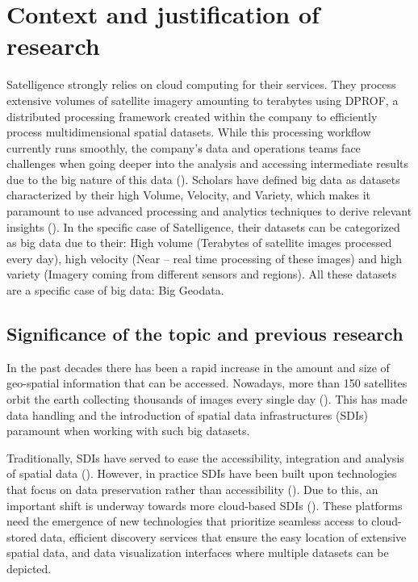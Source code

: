 \documentclass[
  oneside,
  open=any]{scrbook}
\begin{document}
\section{Context and justification of
research}\label{context-and-justification-of-research}

Satelligence strongly relies on cloud computing for their services. They
process extensive volumes of satellite imagery amounting to terabytes
using DPROF, a distributed processing framework created within the
company to efficiently process multidimensional spatial datasets. While
this processing workflow currently runs smoothly, the company's data and
operations teams face challenges when going deeper into the analysis and
accessing intermediate results due to the big nature of this data
().
Scholars have defined big data as datasets characterized by their high
Volume, Velocity, and Variety, which makes it paramount to use advanced
processing and analytics techniques to derive relevant insights
(). In the specific
case of Satelligence, their datasets can be categorized as big data due
to their: High volume (Terabytes of satellite images processed every
day), high velocity (Near -- real time processing of these images) and
high variety (Imagery coming from different sensors and regions). All
these datasets are a specific case of big data: Big Geodata.

\subsection{Significance of the topic and previous
research}\label{significance-of-the-topic-and-previous-research}

In the past decades there has been a rapid increase in the amount and
size of geo-spatial information that can be accessed. Nowadays, more
than 150 satellites orbit the earth collecting thousands of images every
single day (). This
has made data handling and the introduction of spatial data
infrastructures (SDIs) paramount when working with such big datasets.

Traditionally, SDIs have served to ease the accessibility, integration
and analysis of spatial data
(). However, in practice SDIs have been built upon technologies that
focus on data preservation rather than accessibility
(). Due to this,
an important shift is underway towards more cloud-based SDIs
(). These
platforms need the emergence of new technologies that prioritize
seamless access to cloud-stored data, efficient discovery services that
ensure the easy location of extensive spatial data, and data
visualization interfaces where multiple datasets can be depicted.
\end{document}
